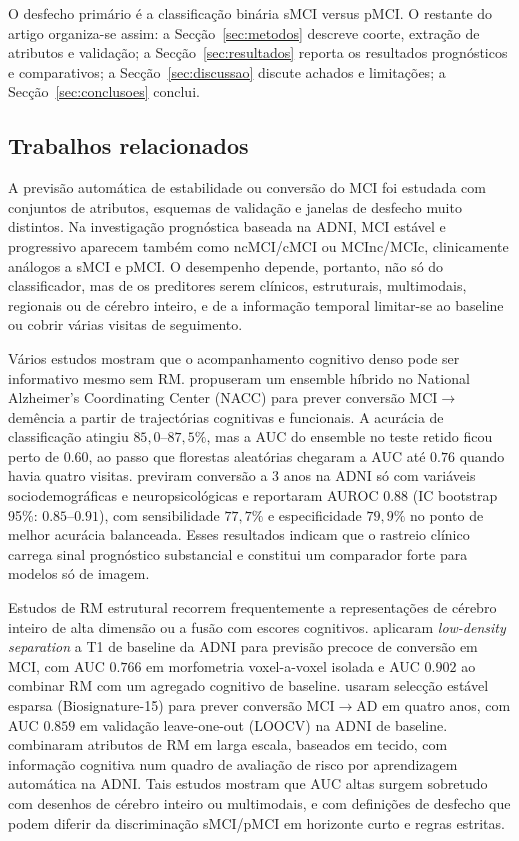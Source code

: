 \documentclass[review]{elsarticle}
\begin{document}
	O desfecho primário é a classificação binária sMCI versus pMCI.
	O restante do artigo organiza-se assim: a Secção~\ref{sec:metodos} descreve coorte, extração de atributos e validação; a Secção~\ref{sec:resultados} reporta os resultados prognósticos e comparativos; a Secção~\ref{sec:discussao} discute achados e limitações; a Secção~\ref{sec:conclusoes} conclui.
	
	
\subsection{Trabalhos relacionados}
\label{subsec:relacionados}

A previsão automática de estabilidade ou conversão do MCI foi estudada com conjuntos de atributos, esquemas de validação e janelas de desfecho muito distintos.
Na investigação prognóstica baseada na ADNI, MCI estável e progressivo aparecem também como ncMCI/cMCI ou MCInc/MCIc, clinicamente análogos a sMCI e pMCI.
O desempenho depende, portanto, não só do classificador, mas de os preditores serem clínicos, estruturais, multimodais, regionais ou de cérebro inteiro, e de a informação temporal limitar-se ao baseline ou cobrir várias visitas de seguimento.

Vários estudos mostram que o acompanhamento cognitivo denso pode ser informativo mesmo sem RM.
\citet{bucholc-2023} propuseram um ensemble híbrido no National Alzheimer's Coordinating Center (NACC) para prever conversão MCI$\to$demência a partir de trajectórias cognitivas e funcionais.
A acurácia de classificação atingiu $85{,}0$--$87{,}5\%$, mas a AUC do ensemble no teste retido ficou perto de $0.60$, ao passo que florestas aleatórias chegaram a AUC até $0.76$ quando havia quatro visitas.
\citet{grassi-2019} previram conversão a 3 anos na ADNI só com variáveis sociodemográficas e neuropsicológicas e reportaram AUROC $0.88$ (IC bootstrap 95\%: $0.85$--$0.91$), com sensibilidade $77{,}7\%$ e especificidade $79{,}9\%$ no ponto de melhor acurácia balanceada.
Esses resultados indicam que o rastreio clínico carrega sinal prognóstico substancial e constitui um comparador forte para modelos só de imagem.

Estudos de RM estrutural recorrem frequentemente a representações de cérebro inteiro de alta dimensão ou a fusão com escores cognitivos.
\citet{moradi-2015} aplicaram \emph{low-density separation} a T1 de baseline da ADNI para previsão precoce de conversão em MCI, com AUC $0.766$ em morfometria voxel-a-voxel isolada e AUC $0.902$ ao combinar RM com um agregado cognitivo de baseline.
\citet{ye-2012} usaram selecção estável esparsa (Biosignature-15) para prever conversão MCI$\to$AD em quatro anos, com AUC $0.859$ em validação leave-one-out (LOOCV) na ADNI de baseline.
\citet{casanova-2013} combinaram atributos de RM em larga escala, baseados em tecido, com informação cognitiva num quadro de avaliação de risco por aprendizagem automática na ADNI.
Tais estudos mostram que AUC altas surgem sobretudo com desenhos de cérebro inteiro ou multimodais, e com definições de desfecho que podem diferir da discriminação sMCI/pMCI em horizonte curto e regras estritas.
\end{document}
